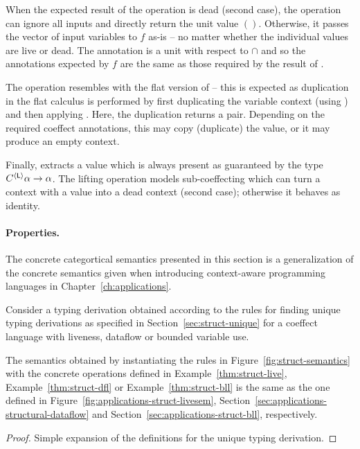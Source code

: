 \noindent
When the expected result of the  operation is dead (second case), the operation can
ignore all inputs and directly return the unit value $()$. Otherwise, it passes the vector of
input variables to $f$ as-is -- no matter whether the individual values are live or dead. The
 annotation is a unit with respect to $\cap$ and so the annotations expected by $f$ are
the same as those required by the result of .

The  operation resembles with the flat version of  -- this is expected as
duplication in the flat calculus is performed by first duplicating the variable context (using
) and then applying . Here, the duplication returns a pair. Depending on the
required coeffect annotations, this may copy (duplicate) the value, or it may produce an empty context.

Finally,  extracts a value which is always present as guaranteed by the type
$C^{\langle \textnormal{\sffamily L} \rangle}\alpha \rightarrow \alpha$. The lifting operation models
sub-coeffecting which can turn a context with a value into a dead context (second case); otherwise
it behaves as identity.

\paragraph{Properties.}
The concrete categortical semantics presented in this section is a generalization of the concrete
semantics given when introducing context-aware programming languages in Chapter~\ref{ch:applications}.

\begin{theorem}[Generalization]
\label{thm:struct-generalization}

Consider a typing derivation obtained according to the rules for finding unique typing derivations
as specified in Section~\ref{sec:struct-unique} for a coeffect language with liveness, dataflow or
bounded variable use.

The semantics obtained by instantiating the rules in Figure~\ref{fig:struct-semantics} with the
concrete operations defined in Example~\ref{thm:struct-live},
Example~\ref{thm:struct-dfl} or Example~\ref{thm:struct-bll} is the
same as the one defined in Figure~\ref{fig:applications-struct-livesem},
Section~\ref{sec:applications-structural-dataflow} and Section~\ref{sec:applications-struct-bll},
respectively.
\end{theorem}
\begin{proof}
Simple expansion of the definitions for the unique typing derivation.
\end{proof}



